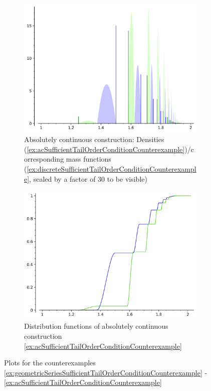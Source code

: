\documentclass[a4paper,DIV=11,abstracton,twoside=semi]{scrreprt}
\theoremstyle{definition}
\begin{document}
\begin{figure}
        \vspace*{0.01\textwidth}
        \begin{subfigure}[t]{0.49\textwidth}
            \includegraphics[width=\textwidth]{Pictures/ac-densities-masses.png}
            \caption{Absolutely continuous construction: Densities (\ref{ex:acSufficientTailOrderConditionCounterexample})/corresponding mass functions (\ref{ex:discreteSufficientTailOrderConditionCounterexample}, scaled by a factor of 30 to be visible)}
            \label{fig:acCounterexample-masses-densities}
        \end{subfigure}
        \begin{subfigure}[t]{0.49\textwidth}
            \includegraphics[width=\textwidth]{Pictures/ac-distribution.png}
            \caption{Distribution functions of absolutely continuous construction \ref{ex:acSufficientTailOrderConditionCounterexample}}
            \label{fig:acCounterexample-distribution}
        \end{subfigure}
        
        \label{fig:sufficientTailOrderConditionsCounterexamples}
        \caption{Plots for the counterexamples \ref{ex:geometricSeriesSufficientTailOrderConditionCounterexample} - \ref{ex:acSufficientTailOrderConditionCounterexample}}
    \end{figure}
\end{document}
